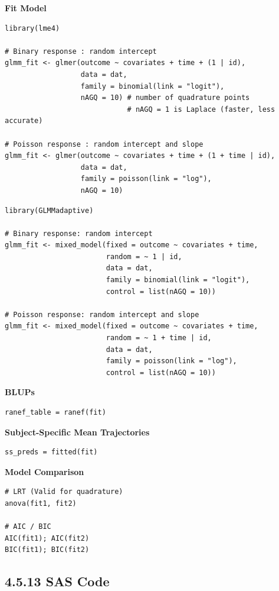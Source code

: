 \documentclass[11pt]{article}
\begin{document}
\textbf{Fit Model}
\begin{lstlisting}[style=Rstyle]
library(lme4)

# Binary response : random intercept
glmm_fit <- glmer(outcome ~ covariates + time + (1 | id),
                  data = dat,
                  family = binomial(link = "logit"),
                  nAGQ = 10) # number of quadrature points
                             # nAGQ = 1 is Laplace (faster, less accurate)

# Poisson response : random intercept and slope
glmm_fit <- glmer(outcome ~ covariates + time + (1 + time | id),
                  data = dat,
                  family = poisson(link = "log"),
                  nAGQ = 10)
\end{lstlisting}

\begin{lstlisting}[style=Rstyle]
library(GLMMadaptive)

# Binary response: random intercept
glmm_fit <- mixed_model(fixed = outcome ~ covariates + time,
                        random = ~ 1 | id,
                        data = dat,
                        family = binomial(link = "logit"),
                        control = list(nAGQ = 10))

# Poisson response: random intercept and slope
glmm_fit <- mixed_model(fixed = outcome ~ covariates + time,
                        random = ~ 1 + time | id,
                        data = dat,
                        family = poisson(link = "log"),
                        control = list(nAGQ = 10))
\end{lstlisting}

\textbf{BLUPs}
\begin{lstlisting}[style=Rstyle]
ranef_table = ranef(fit)
\end{lstlisting}

\textbf{Subject-Specific Mean Trajectories}
\begin{lstlisting}[style=Rstyle]
ss_preds = fitted(fit)
\end{lstlisting}

\textbf{Model Comparison}
\begin{lstlisting}[style=Rstyle]
# LRT (Valid for quadrature)
anova(fit1, fit2)

# AIC / BIC
AIC(fit1); AIC(fit2)
BIC(fit1); BIC(fit2)
\end{lstlisting}

\subsection{4.5.13 SAS Code}
\end{document}

